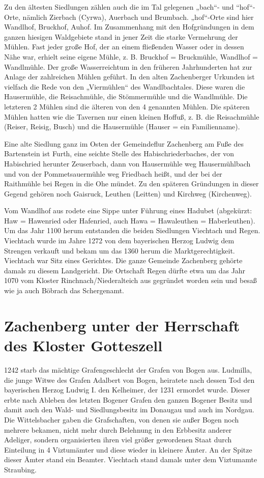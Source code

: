 \documentclass[12pt,a4pager,draft]{book}
\begin{document}
Zu den ältesten Siedlungen zählen auch die im Tal gelegenen „bach“- und
“hof“-Orte, nämlich Zierbach (Cyrwa), Auerbach und Brumbach. „hof“-Orte sind
hier Wandlhof, Bruckhof, Auhof. Im Zusammenhang mit den Hofgründungen in dem
ganzen hiesigen Waldgebiete stand in jener Zeit die starke Vermehrung der
Mühlen. Fast jeder große Hof, der an einem fließenden Wasser oder in dessen Nähe
war, erhielt seine eigene Mühle, z. B. Bruckhof = Bruckmühle, Wandlhof =
Wandlmühle. Der große Wasserreichtum in den früheren Jahrhunderten hat zur
Anlage der zahlreichen Mühlen geführt. In den alten Zachenberger Urkunden ist
vielfach die Rede von den „Viermühlen“ des Wandlbachtales. Diese waren die
Hausermühle, die Reisachmühle, die Stömmermühle und die Wandlmühle. Die
letzteren 2 Mühlen sind die älteren von den 4 genannten Mühlen. Die späteren
Mühlen hatten wie die Tavernen nur einen kleinen Hoffuß, z. B. die Reisachmühle
(Reiser, Reisig, Busch) und die Hausermühle (Hauser = ein Familienname).

Eine alte Siedlung ganz im Osten der Gemeindeflur Zachenberg am Fuße des
Bartenstein ist Furth, eine seichte Stelle des Habischriederbaches, der von
Habischried herunter Zeuserbach, dann von Hausermühle weg Hausermühlbach und von
der Pommetsauermühle weg Friedbach heißt, und der bei der Raithmühle bei Regen
in die Ohe mündet. Zu den späteren Gründungen in dieser Gegend gehören noch
Gaisruck, Leuthen (Leitten) und Kirchweg (Kirchenweg).

Vom Wandlhof aus rodete eine Sippe unter Führung eines Hadubet (abgekürzt: Haw =
Hawenried oder Hafenried, auch Hawa = Hawaleuthen = Haberleuthen). Um das Jahr
1100 herum entstanden die beiden Siedlungen Viechtach und Regen. Viechtach wurde
im Jahre 1272 von dem bayerischen Herzog Ludwig dem Strengen verkauft und bekam
um das 1360 herum die Marktgerechtigkeit. Viechtach war Sitz eines Gerichtes.
Die ganze Gemeinde Zachenberg gehörte damals zu diesem Landgericht. Die
Ortschaft Regen dürfte etwa um das Jahr 1070 vom Kloster Rinchnach/Niederalteich
aus gegründet worden sein und besaß wie ja auch Böbrach das Schergenamt.

\section{Zachenberg unter der Herrschaft des Kloster Gotteszell}

1242 starb das mächtige Grafengeschlecht der Grafen von Bogen aus. Ludmilla, die
junge Witwe des Grafen Adalbert von Bogen, heiratete nach dessen Tod den
bayerischen Herzog Ludwig I. den Kelheimer, der 1231 ermordet wurde. Dieser
erbte nach Ableben des letzten Bogener Grafen den ganzen Bogener Besitz und
damit auch den Wald- und Siedlungsbesitz im Donaugau und auch im Nordgau. Die
Wittelsbacher gaben die Grafschaften, von denen sie außer Bogen noch mehrere
bekamen, nicht mehr durch Belehnung in den Erbbesitz anderer Adeliger, sondern
organisierten ihren viel größer gewordenen Staat durch Einteilung in 4
Viztumämter und diese wieder in kleinere Ämter. An der Spitze dieser Ämter stand
ein Beamter. Viechtach stand damals unter dem Viztumamte Straubing.
\end{document}
